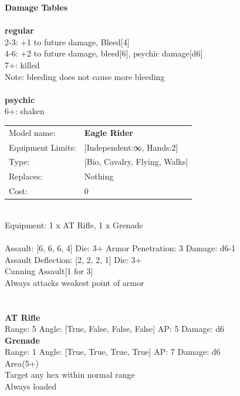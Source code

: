 {\bf Damage Tables} \\
\ \\ {\bf regular } \\
2-3: +1 to future damage, Bleed[4] \\
4-6: +2 to future damage, bleed[6], psychic damage[d6] \\
7+: killed \\
Note: bleeding does not cause more bleeding \\
\ \\ {\bf psychic } \\
6+: shaken \\


\noindent
\begin{tabular}{ll}
Model name: &{\bf Eagle Rider } \\
Equipment Limits: &[Independent:∞, Hands:2] \\
Type: &[Bio, Cavalry, Flying, Walks] \\
Replaces: &Nothing \\
Cost: & 0\\
\end{tabular}
\ \\
Equipment: 1 x AT Rifle, 1 x Grenade \\
\ \\
Assault: [6, 6, 6, 4] Die: 3+ Armor Penetration: 3 Damage: d6-1 \\
Assault Deflection: [2, 2, 2, 1] Die: 3+\\
\indent Cunning Assault[1 for 3]\\ 
Always attacks weakest point of armor\\ 
 
\ \\

\ \\
{\bf AT Rifle } \\



Range: 5  Angle: [True, False, False, False] AP: 5 Damage: d6 \\




{\bf Grenade } \\



Range: 1  Angle: [True, True, True, True] AP: 7 Damage: d6 \\
Area(5+)\\ 
Target any hex within normal range\\ 
Always loaded\\ 




